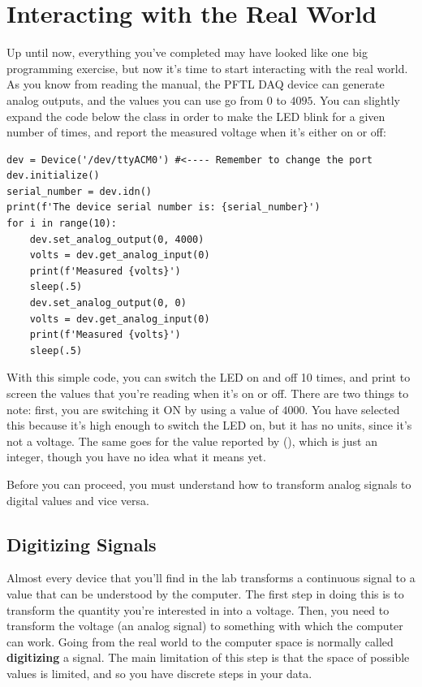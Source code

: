 \section{Interacting with the Real World}\label{sec:doing-something-in-theemph}
Up until now, everything you've completed may have looked like one big programming exercise, but now it's time to start interacting with the real world. As you know from reading the manual, the {PFTL DAQ} device can generate analog outputs, and the values you can use go from $0$ to $4095$. You can slightly expand the code below the class in order to make the LED blink for a given number of times, and report the measured voltage when it's either on or off:

\begin{verbatim}
dev = Device('/dev/ttyACM0') #<---- Remember to change the port
dev.initialize()
serial_number = dev.idn()
print(f'The device serial number is: {serial_number}')
for i in range(10):
    dev.set_analog_output(0, 4000)
    volts = dev.get_analog_input(0)
    print(f'Measured {volts}')
    sleep(.5)
    dev.set_analog_output(0, 0)
    volts = dev.get_analog_input(0)
    print(f'Measured {volts}')
    sleep(.5)
\end{verbatim}

With this simple code, you can switch the LED on and off 10 times, and print to screen the values that you're reading when it's on or off. There are two things to note: first, you are switching it ON by using a value of $4000$. You have selected this because it's high enough to switch the LED on, but it has no units, since it's not a voltage. The same goes for the value reported by (), which is just an integer, though you have no idea what it means yet.

Before you can proceed, you must understand how to transform analog signals to digital values and vice versa.

\subsection{Digitizing Signals}\label{subsec:adc-dca}
Almost every device that you'll find in the lab transforms a continuous signal to a value that can be understood by the computer. The first step in doing this is to transform the quantity you're interested in into a voltage. Then, you need to transform the voltage (an analog signal) to something with which the computer can work. Going from the real world to the computer space is normally called \textbf{digitizing} a signal. The main limitation of this step is that the space of possible values is limited, and so you have discrete steps in your data.

